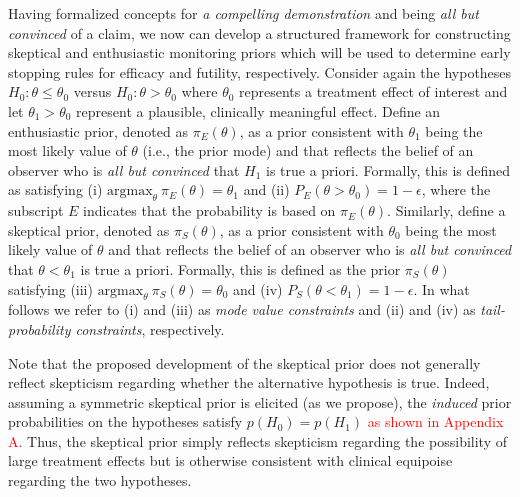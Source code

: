 \documentclass[12pt]{article}
\begin{document}
Having formalized concepts for \textit{a compelling demonstration} and  being \textit{all but convinced} of a claim, we now can develop a structured framework for constructing skeptical and enthusiastic monitoring priors which will be used to determine early stopping rules for efficacy and futility, respectively.
%
Consider again the hypotheses $H_0: \theta \le \theta_0$ versus $H_0: \theta > \theta_0$ where $\theta_0$ represents a 
treatment effect of interest and let $\theta_1>\theta_0$ represent a plausible, clinically meaningful effect.
%
Define an enthusiastic prior, denoted as $\pi_{E}(\theta)$, as a prior consistent with $\theta_1$ being the most 
likely value of $\theta$ (i.e., the prior mode) and that reflects the belief of an observer who is 
\textit{all but convinced} that $H_1$ is true a priori. 
%
Formally, this is defined as satisfying (i) $\text{argmax}_\theta~\pi_E(\theta)=\theta_1$
and (ii) $P_E(\theta >\theta_0)=1-\epsilon$, where the subscript $E$ indicates that the probability is 
based on $\pi_{E}(\theta)$.
%
Similarly, define a skeptical prior, denoted as $\pi_{S}(\theta)$, as a prior consistent with $\theta_0$ being the most 
likely value of $\theta$ and that reflects the belief of an observer who is \textit{all but convinced} that 
$\theta <\theta_1$ is true a priori. 
%
Formally, this is defined as the prior $\pi_{S}(\theta)$ satisfying
(iii) $\text{argmax}_\theta~\pi_S(\theta)=\theta_0$  and (iv) $P_S(\theta <\theta_1)=1-\epsilon$.
%
In what follows we refer to (i) and (iii) as \textit{mode value constraints} and (ii) and (iv) as \textit{tail-probability constraints}, respectively.

Note that the proposed development of the skeptical prior does not generally reflect skepticism regarding whether the alternative hypothesis is true. 
%
Indeed, assuming a symmetric skeptical prior is elicited (as we propose), the \textit{induced} prior probabilities on the hypotheses
satisfy $p(H_0) =  p(H_1)$ \textcolor{red}{as shown in Appendix A.}
%
%
%
Thus, the skeptical prior simply reflects skepticism regarding the possibility of large treatment effects but is
otherwise consistent with clinical equipoise regarding the two hypotheses.
%
\end{document}
